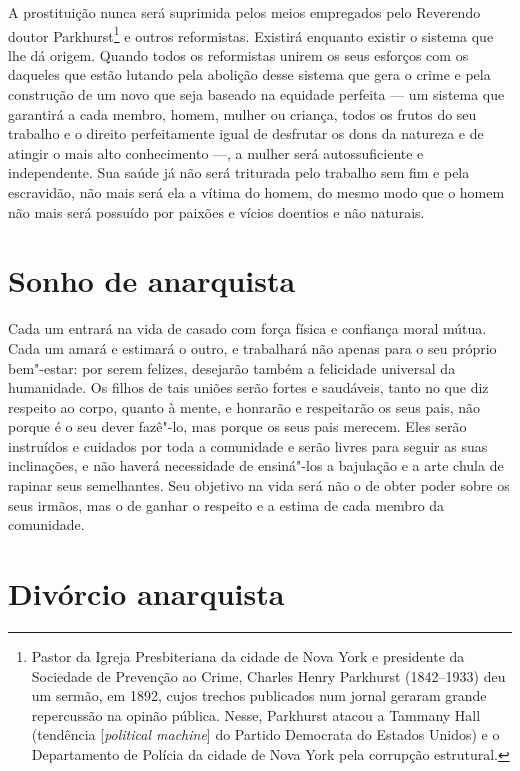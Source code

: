 A prostituição nunca será suprimida pelos meios empregados pelo
Reverendo doutor Parkhurst\footnote{Pastor da Igreja Presbiteriana da cidade de Nova York e presidente da Sociedade de Prevenção ao Crime, Charles Henry Parkhurst (1842--1933) deu um sermão, em 1892, cujos trechos publicados num jornal geraram grande repercussão na opinão pública. Nesse, Parkhurst atacou a Tammany Hall (tendência [\textit{political machine}] do Partido Democrata do Estados Unidos) e o Departamento de Polícia da cidade de Nova York pela corrupção estrutural.} e outros reformistas. Existirá enquanto
existir o sistema que lhe dá origem. Quando todos os reformistas
unirem os seus esforços com os daqueles que estão lutando pela abolição desse sistema
que gera o crime e pela construção de um novo que seja baseado na
equidade perfeita --- um sistema que garantirá a cada membro, homem,
mulher ou criança, todos os frutos do seu trabalho e o direito
perfeitamente igual de desfrutar os dons da natureza e de atingir o
mais alto conhecimento ---, a mulher será autossuficiente e independente.
Sua saúde já não será triturada pelo trabalho sem fim e pela escravidão,
não mais será ela a vítima do homem, do mesmo modo que o homem não mais
será possuído por paixões e vícios doentios e não naturais.

\section{Sonho de anarquista}

Cada um entrará na vida de casado com força física e confiança moral
mútua. Cada um amará e estimará o outro, e trabalhará não apenas para o
seu próprio bem"-estar: por serem felizes, desejarão também a felicidade
universal da humanidade. Os filhos de tais uniões serão fortes e
saudáveis, tanto no que diz respeito ao corpo, quanto à mente, e
honrarão e respeitarão os seus pais, não porque é o seu dever fazê"-lo,
mas porque os seus pais merecem. Eles serão instruídos e cuidados por
toda a comunidade e serão livres para seguir as suas inclinações, e não
haverá necessidade de ensiná"-los a bajulação e a arte chula de rapinar
seus semelhantes. Seu objetivo na vida será não o de obter poder sobre
os seus irmãos, mas o de ganhar o respeito e a estima de cada membro da
comunidade.

\section{Divórcio anarquista}

